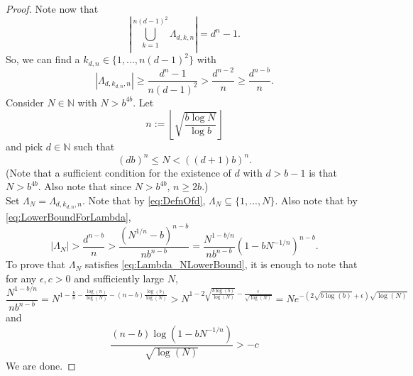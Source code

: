 \documentclass[11pt,american,preprint]{elsarticle}
\numberwithin{equation}{section}
\theoremstyle{plain}
\theoremstyle{plain*}
\theoremstyle{plain}
\theoremstyle{plain*}
\theoremstyle{plain}
\theoremstyle{plain*}
\theoremstyle{remark}
\theoremstyle{remark*}
\theoremstyle{remark}
\theoremstyle{remark*}
\theoremstyle{remark}
\theoremstyle{remark*}
\theoremstyle{plain}
\theoremstyle{definition}
\theoremstyle{plain}
\theoremstyle{plain} %
\newcommand{\N}{\mathbb{N}}
\begin{document}
\begin{proof}
Note now that 
$$
|\bigcup_{k=1}^{n(d-1)^2}\Lambda_{d,k,n}|=d^n-1.
$$
So, we  can find a $k_{d,n}\in \{1,...,n(d-1)^2\}$ with 
\begin{equation}\label{eq:LowerBoundForLambda}
|\Lambda_{d,k_{d,n},n}|\geq \frac{d^n-1}{n(d-1)^2}>\frac{d^{n-2}}{n}\geq \frac{d^{n-b}}{n}.
\end{equation}
Consider $N\in\N$ with $N>b^{4b}$. Let 
\begin{equation}\label{eq:DefnOfn}
    n:=\left\lfloor \sqrt{\frac{b\log N}{\log b}}\right\rfloor 
\end{equation}
and pick $d\in\N$ such that
\begin{equation}\label{eq:DefnOfd}
(db)^n\leq N<((d+1)b)^n. 
\end{equation}
(Note that a sufficient condition for the existence of $d$ with $d>b-1$ is that $N>b^{4b}$. Also note that since $N>b^{4b}$, $n\geq 2b$.)\\
Set $\Lambda_N=\Lambda_{d,k_{d,n},n}$. Note that by \eqref{eq:DefnOfd}, $\Lambda_N\subseteq \{1,...,N\}$. Also note  that by  \eqref{eq:LowerBoundForLambda},
\begin{equation*}
    |\Lambda_N|>\frac{d^{n-b}}{n}>\frac{(N^{1/n}-b)^{n-b}}{nb^{n-b}}
    =\frac{N^{1-b/n}}{nb^{n-b}}(1-bN^{-1/n})^{n-b}.
\end{equation*}
To prove that $\Lambda_N$ satisfies \eqref{eq:Lambda_NLowerBound}, it is enough to note that for any $\epsilon,c>0$ and  sufficiently large $N$, 
\begin{equation*}
    \frac{N^{1-b/n}}{nb^{n-b}}=N^{1-\frac{b}{n}-\frac{\log (n)}{\log(N)}-(n-b)\frac{\log(b)}{\log(N)}}>N^{1-2\sqrt{\frac{b\log(b)}{\log(N)}}-\frac{\epsilon}{\sqrt{\log(N)}}}=Ne^{-(2\sqrt{b\log(b)}+\epsilon)\sqrt{\log(N)}}
\end{equation*}
and 
\begin{equation*}
\frac{(n-b)\log(1-bN^{-1/n})}{\sqrt{\log(N)}}>-c
\end{equation*}
We are done.  
\end{proof}
\end{document}
